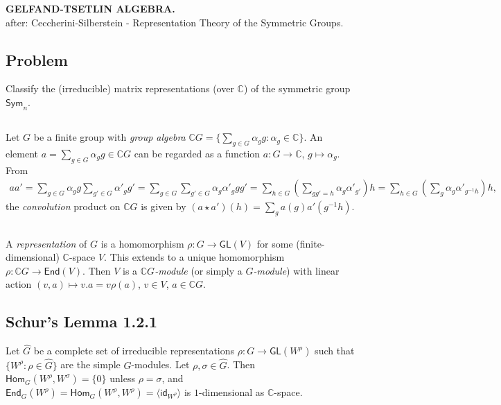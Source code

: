 \documentclass[a4paper]{amsart}
\newcommand{\C}{\mathbb{C}}
\newcommand{\Sym}{\mathsf{Sym}}
\newcommand{\GL}{\mathsf{GL}}
\newcommand{\Hom}{\mathsf{Hom}}
\newcommand{\End}{\mathsf{End}}
\newcommand{\id}{\mathsf{id}}
\newcommand{\Span}[1]{\langle#1\rangle}
\begin{document}
\begin{center}
  \textbf{\uppercase{
Gelfand-Tsetlin Algebra.
}}\\
after: Ceccherini-Silberstein - Representation Theory of the Symmetric Groups.
\end{center}

\subsection{Problem}
Classify the (irreducible) matrix representations (over $\C$) of the symmetric group $\Sym_n$.

\subsection{}
Let $G$ be a finite group with \emph{group algebra} $\C G = \{ \sum_{g
  \in G} \alpha_g g : \alpha_g \in \C \}$.  An element $a = \sum_{g
  \in G} \alpha_g g \in \C G$ can be regarded as a function $a \colon G
\to \C$, $g \mapsto \alpha_g$.  From 
\begin{align*}
  a a' = \sum_{g \in G} \alpha_g g \sum_{g' \in G} \alpha'_g g'
= \sum_{g \in G} \sum_{g' \in G} \alpha_g  \alpha'_g  g g'
= \sum_{h \in G}  (\sum_{gg' = h} \alpha_g \alpha'_{g'}) h
= \sum_{h \in G}  (\sum_g \alpha_g \alpha'_{g^{-1}h}) h,
\end{align*}
the \emph{convolution} product  on $\C G$ is given by $(a \star a')(h) = 
\sum_g a(g) a'(g^{-1}h)$.

\subsection{}
A \emph{representation} of
$G$ is a homomorphism $\rho \colon G \to \GL(V)$ for some
(finite-dimensional) $\C$-space $V$.  This extends to a unique
homomorphism $\rho \colon \C G \to \End(V)$. Then $V$ is a \emph{$\C
  G$-module} (or simply a \emph{$G$-module}) with linear action $(v,
a) \mapsto v.a= v \rho(a)$, $v \in V$, $a \in \C G$.

\subsection{Schur's Lemma 1.2.1}
Let $\hat{G}$ be a complete set of irreducible representations $ \rho
\colon G \to \GL(W^{\rho})$ such that $\{W^{\rho}: \rho \in \hat{G}\}$
are the simple $G$-modules.  Let $\rho, \sigma \in \hat{G}$.  Then
$\Hom_G(W^{\rho}, W^{\sigma}) = \{0\}$ unless $\rho = \sigma$, and
$\End_G(W^{\rho}) = \Hom_G(W^{\rho}, W^{\rho}) =
\Span{\id_{W^{\rho}}}$ is $1$-dimensional as $\C$-space.
\end{document}
